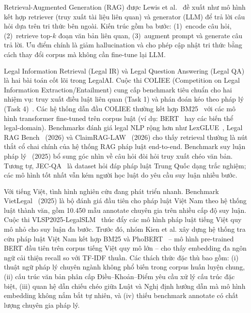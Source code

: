 \documentclass[../DoAn.tex]{subfiles}
\begin{document}
Retrieval-Augmented Generation (\gls{RAG}) được Lewis et al.~\cite{lewis2020rag} đề xuất như mô hình kết hợp retriever (truy xuất tài liệu liên quan) và generator (\gls{LLM}) để trả lời câu hỏi dựa trên tri thức bên ngoài. Kiến trúc gồm ba bước: (1)~encode câu hỏi, (2)~retrieve top-$k$ đoạn văn bản liên quan, (3)~augment prompt và generate câu trả lời. Ưu điểm chính là giảm hallucination và cho phép cập nhật tri thức bằng cách thay đổi corpus mà không cần fine-tune lại LLM.

Legal Information Retrieval (Legal IR) và Legal Question Answering (Legal QA) là hai bài toán cốt lõi trong \gls{LegalAI}. Cuộc thi COLIEE (Competition on Legal Information Extraction/Entailment) cung cấp benchmark tiêu chuẩn cho hai nhiệm vụ: truy xuất điều luật liên quan (Task 1) và phán đoán kéo theo pháp lý (Task 4)~\cite{kim2022coliee}. Các hệ thống dẫn đầu COLIEE thường kết hợp BM25~\cite{robertson1994bm25} với các mô hình transformer fine-tuned trên corpus luật (ví dụ: BERT~\cite{devlin2019bert} hay các biến thể legal-domain). Benchmarks đánh giá legal NLP rộng hơn như LexGLUE~\cite{chalkidis2022lexglue}, Legal RAG Bench~\cite{butler2026legalragbench} (2026) và ClaimRAG-LAW~\cite{das2026claimraglaw} (2026) cho thấy retrieval thường là nút thắt cổ chai chính của hệ thống RAG pháp luật end-to-end. Benchmark suy luận pháp lý~\cite{zheng2025legalretrieval} (2025) bổ sung góc nhìn về câu hỏi đòi hỏi truy xuất chéo văn bản. Tương tự, JEC-QA~\cite{zhong2020jecqa} là dataset hỏi đáp pháp luật Trung Quốc dạng trắc nghiệm; các mô hình tốt nhất vẫn kém người học luật do yêu cầu suy luận nhiều bước.

Với tiếng Việt, tình hình nghiên cứu đang phát triển nhanh. Benchmark VietLegal~\cite{dong2025vietlegal} (2025) là bộ đánh giá đầu tiên cho pháp luật Việt Nam theo hệ thống luật thành văn, gồm 10.450 mẫu annotate chuyên gia trên nhiều cấp độ suy luận. Cuộc thi VLSP2025-LegalSLM~\cite{nguyen2025minlegal} thúc đẩy các mô hình pháp luật tiếng Việt quy mô nhỏ cho suy luận đa bước. Trước đó, nhóm Kien et al. xây dựng hệ thống tra cứu pháp luật Việt Nam kết hợp BM25 và PhoBERT~\cite{nguyen2020phobert} -- mô hình pre-trained BERT đầu tiên trên corpus tiếng Việt quy mô lớn -- cho thấy embedding đa ngôn ngữ cải thiện recall so với TF-IDF thuần. Các thách thức đặc thù bao gồm: (i) thuật ngữ pháp lý chuyên ngành không phổ biến trong corpus huấn luyện chung, (ii) cấu trúc văn bản phân cấp Điều--Khoản--Điểm yêu cầu xử lý cấu trúc đặc biệt, (iii) quan hệ dẫn chiếu chéo giữa Luật và Nghị định hướng dẫn mà mô hình embedding không nắm bắt tự nhiên, và (iv) thiếu benchmark annotate có chất lượng chuyên gia pháp lý.
\end{document}
